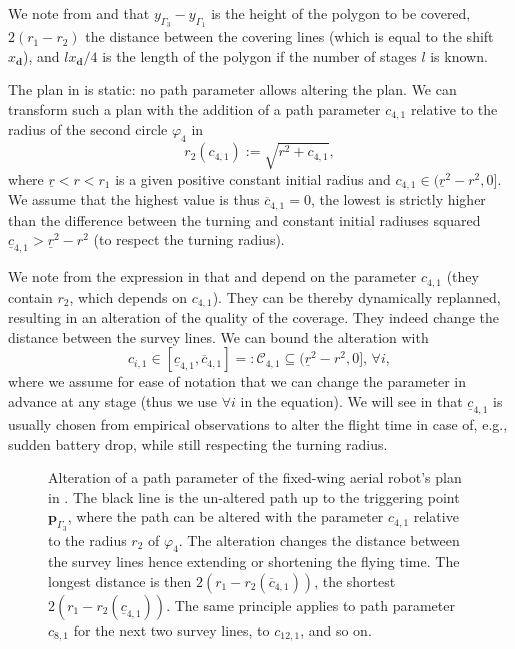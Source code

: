 We note from  and  that $y_{\Gamma_3}-y_{\Gamma_1}$ is the height of the polygon to be covered, $2(r_1-r_2)$ the distance between the covering lines (which is equal to the shift $x_\mathbf{d}$), and $lx_\mathbf{d}/4$ is the length of the polygon if the number of stages $l$ is known.


The plan in  is static: no path parameter allows altering the plan. We can transform such a plan with the addition of a path parameter $c_{4,1}$ relative to the radius of the second circle $\varphi_4$ in 
\begin{equation}\label{eq:radius-dynamic}
  r_2(c_{4,1}):=\sqrt{r^2+c_{4,1}},
\end{equation}
where $\underline{r}<r<r_1$ is a given positive constant initial radius and $c_{4,1}\in(\underline{r}^2-r^2,0]$. We assume that the highest value is thus $\overline{c}_{4,1}=0$, the lowest is strictly higher than the difference between the turning and constant initial radiuses squared $\underline{c}_{4,1}>\underline{r}^2-r^2$ (to respect the turning radius).

We note from the expression in  that  and  depend on the parameter $c_{4,1}$ (they contain $r_2$, which depends on $c_{4,1}$). They can be thereby dynamically replanned, resulting in an alteration of the quality of the coverage. They indeed change the distance between the survey lines.
We can bound the alteration with 
\begin{equation}\label{eq:path-const-c}
  c_{i,1}\in[\underline{c}_{4,1},\overline{c}_{4,1}]=:\mathcal{C}_{4,1}\subseteq(\underline{r}^2-r^2,0],\,\forall i,
\end{equation} 
where we assume for ease of notation that we can change the parameter in advance at any stage (thus we use $\forall i$ in the equation). We will see in  that $\underline{c}_{4,1}$ is usually chosen from empirical observations to alter the flight time in case of, e.g., sudden battery drop, while still respecting the turning radius.

\begin{sidewaysfigure}
  \rotatesidewayslabel
  \centering
  
  \vspace*{42pt}
  \caption[Alteration of a path parameter of the fixed-wing aerial robot's plan]{Alteration of a path parameter of the fixed-wing aerial robot's plan in . The black line is the un-altered path up to the triggering point $\mathbf{p}_{\Gamma_3}$, where the path can be altered with the parameter $c_{4,1}$ relative to the radius $r_2$ of $\varphi_4$. The alteration changes the distance between the survey lines hence extending or shortening the flying time. The longest distance is then $2(r_1-r_2(\overline{c}_{4,1}))$, the shortest $2(r_1-r_2(\underline{c}_{4,1}))$. The same principle applies to path parameter $c_{8,1}$ for the next two survey lines, to $c_{12,1}$, and so on.}
  \label{fig:zambo-repla_pb}
\end{sidewaysfigure}

